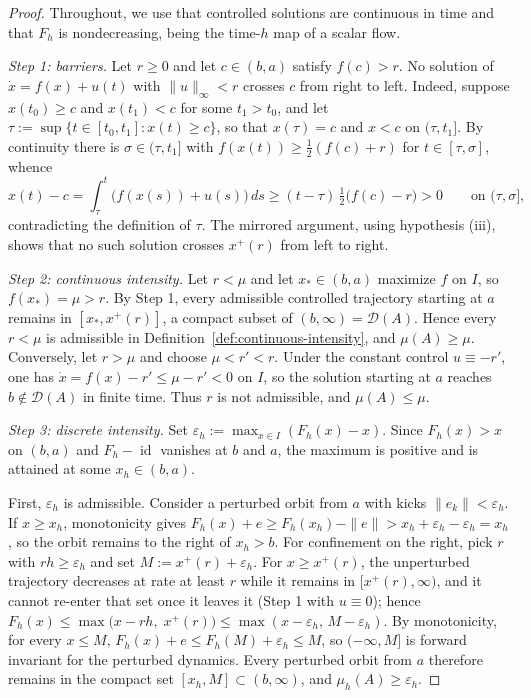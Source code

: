 \documentclass[10pt,a4paper]{amsart}
\begin{document}
\begin{proof}
Throughout, we use that controlled solutions are continuous in time and
that $F_h$ is nondecreasing, being the time-$h$ map of a scalar flow.

\emph{Step 1: barriers.}
Let $r\geq0$ and let $c\in(b,a)$ satisfy $f(c)>r$. No solution of
$\dot x=f(x)+u(t)$ with $\|u\|_\infty<r$ crosses $c$ from right to
left. Indeed, suppose $x(t_0)\geq c$ and $x(t_1)<c$ for some
$t_1>t_0$, and let
$\tau:=\sup\{t\in[t_0,t_1]:x(t)\geq c\}$, so that $x(\tau)=c$ and
$x<c$ on $(\tau,t_1]$. By continuity there is $\sigma\in(\tau,t_1]$
with $f(x(t))\geq\tfrac12(f(c)+r)$ for $t\in[\tau,\sigma]$, whence
\[
    x(t)-c
    =
    \int_\tau^t\bigl(f(x(s))+u(s)\bigr)\,ds
    \geq
    (t-\tau)\,\tfrac12\bigl(f(c)-r\bigr)
    >0
    \qquad\text{on }(\tau,\sigma],
\]
contradicting the definition of $\tau$. The mirrored argument, using
hypothesis (iii), shows that no such solution crosses $x^+(r)$ from
left to right.

\emph{Step 2: continuous intensity.}
Let $r<\mu$ and let $x_*\in(b,a)$ maximize $f$ on $I$, so
$f(x_*)=\mu>r$. By Step 1, every admissible controlled trajectory
starting at $a$ remains in $[x_*,x^+(r)]$, a compact subset of
$(b,\infty)=\mathcal D(A)$. Hence every $r<\mu$ is admissible in
Definition~\ref{def:continuous-intensity}, and $\mu(A)\geq\mu$.
Conversely, let $r>\mu$ and choose $\mu<r'<r$. Under the constant
control $u\equiv-r'$, one has $\dot x=f(x)-r'\leq\mu-r'<0$ on $I$, so
the solution starting at $a$ reaches $b\notin\mathcal D(A)$ in finite
time. Thus $r$ is not admissible, and $\mu(A)\leq\mu$.

\emph{Step 3: discrete intensity.}
Set $\varepsilon_h:=\max_{x\in I}(F_h(x)-x)$. Since $F_h(x)>x$ on
$(b,a)$ and $F_h-\operatorname{id}$ vanishes at $b$ and $a$, the
maximum is positive and is attained at some $x_h\in(b,a)$.

First, $\varepsilon_h$ is admissible. Consider a perturbed orbit from
$a$ with kicks $\|e_k\|<\varepsilon_h$. If $x\geq x_h$, monotonicity
gives
    $F_h(x)+e
    \geq
    F_h(x_h)-\|e\|
    >
    x_h+\varepsilon_h-\varepsilon_h
    =
    x_h$,
so the orbit remains to the right of $x_h>b$. For confinement on the
right, pick $r$ with $rh\geq\varepsilon_h$ and set
$M:=x^+(r)+\varepsilon_h$. For $x\geq x^+(r)$, the unperturbed
trajectory decreases at rate at least $r$ while it remains in
$[x^+(r),\infty)$, and it cannot re-enter that set once it leaves it
(Step 1 with $u\equiv0$); hence
$F_h(x)\leq\max\bigl(x-rh,\;x^+(r)\bigr)\leq\max(x-\varepsilon_h,\,
M-\varepsilon_h)$. By monotonicity, for every $x\leq M$,
    $F_h(x)+e
    \leq
    F_h(M)+\varepsilon_h
    \leq
    M$,
so $(-\infty,M]$ is forward invariant for the perturbed dynamics.
Every perturbed orbit from $a$ therefore remains in the compact set
$[x_h,M]\subset(b,\infty)$, and $\mu_h(A)\geq\varepsilon_h$.


\end{proof}
\end{document}
